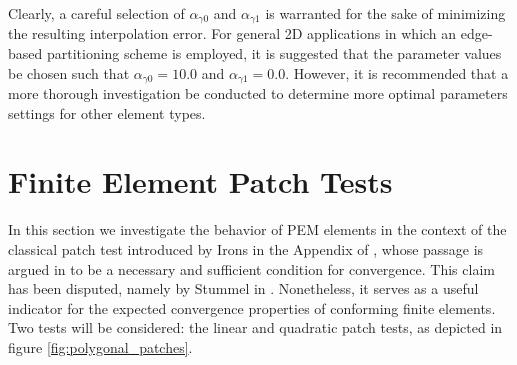Clearly, a careful selection of $\alpha_{\gamma0}$ and $\alpha_{\gamma1}$ is warranted for the sake of minimizing the resulting interpolation error. For general 2D applications in which an edge-based partitioning scheme is employed, it is suggested that the parameter values be chosen such that $\alpha_{\gamma0} = 10.0$ and $\alpha_{\gamma1} = 0.0$. However, it is recommended that a more thorough investigation be conducted to determine more optimal parameters settings for other element types.

\section{Finite Element Patch Tests}

In this section we investigate the behavior of PEM elements in the context of the classical patch test introduced by Irons in the Appendix of \cite{Irons:65}, whose passage is argued in \cite{Simo&Taylor:86} to be a necessary and sufficient condition for convergence. This claim has been disputed, namely by Stummel in \cite{Stummel:80}. Nonetheless, it serves as a useful indicator for the expected convergence properties of conforming finite elements. Two tests will be considered: the linear and quadratic patch tests, as depicted in figure \ref{fig:polygonal_patches}.

